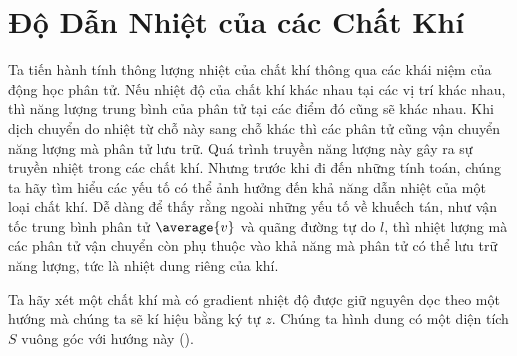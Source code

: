\section{Độ Dẫn Nhiệt của các Chất Khí}\label{sec:16_4}

Ta tiến hành tính thông lượng nhiệt của chất khí thông qua các khái niệm của động học phân tử. Nếu nhiệt độ của chất khí khác nhau tại các vị trí khác nhau, thì năng lượng trung bình của phân tử tại các điểm đó cũng sẽ khác nhau. Khi dịch chuyển do nhiệt từ chỗ này sang chỗ khác thì các phân tử cũng vận chuyển năng lượng mà phân tử lưu trữ. Quá trình truyền năng lượng này gây ra sự truyền nhiệt trong các chất khí. Nhưng trước khi đi đến những tính toán, chúng ta hãy tìm hiểu các yếu tố có thể ảnh hưởng đến khả năng dẫn nhiệt của một loại chất khí. Dễ dàng để thấy rằng ngoài những yếu tố về khuếch tán, như vận tốc trung bình phân tử $\average{v}$ và quãng đường tự do $l$, thì nhiệt lượng mà các phân tử vận chuyển còn phụ thuộc vào khả năng mà phân tử có thể lưu trữ năng lượng, tức là nhiệt dung riêng của khí.

Ta hãy xét một chất khí mà có gradient nhiệt độ được giữ nguyên dọc theo một hướng mà chúng ta sẽ kí hiệu bằng ký tự $z$. Chúng ta hình dung có một diện tích $S$ vuông góc với hướng này ().

